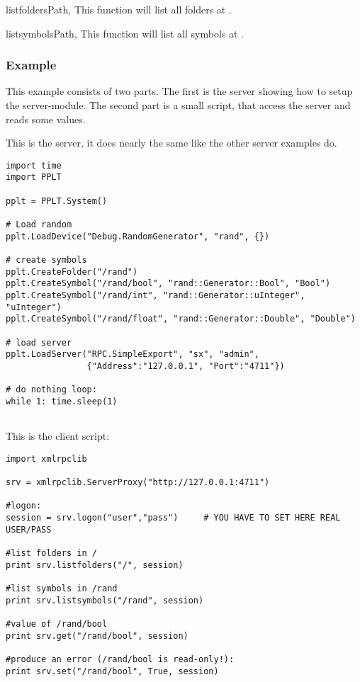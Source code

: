 \begin{funcdescni}{listfolders}{Path, }
This function will list all folders at .
\end{funcdescni}


\begin{funcdescni}{listsymbols}{Path, }
This function will list all symbols at .
\end{funcdescni}


\subsubsection{Example}
This example consists of two parts. The first is the server showing
how to setup the server-module. The second part is a small script, that
access the server and reads some values.

This is the server, it does nearly the same like the other server examples do.
\begin{verbatim}
import time
import PPLT

pplt = PPLT.System()

# Load random
pplt.LoadDevice("Debug.RandomGenerator", "rand", {})

# create symbols
pplt.CreateFolder("/rand")
pplt.CreateSymbol("/rand/bool", "rand::Generator::Bool", "Bool")
pplt.CreateSymbol("/rand/int", "rand::Generator::uInteger", "uInteger")
pplt.CreateSymbol("/rand/float", "rand::Generator::Double", "Double")

# load server
pplt.LoadServer("RPC.SimpleExport", "sx", "admin", 
                {"Address":"127.0.0.1", "Port":"4711"})

# do nothing loop:
while 1: time.sleep(1)
    
\end{verbatim}


This is the client script:
\begin{verbatim}
import xmlrpclib

srv = xmlrpclib.ServerProxy("http://127.0.0.1:4711")

#logon:
session = srv.logon("user","pass")     # YOU HAVE TO SET HERE REAL USER/PASS

#list folders in /
print srv.listfolders("/", session)

#list symbols in /rand
print srv.listsymbols("/rand", session)

#value of /rand/bool
print srv.get("/rand/bool", session)

#produce an error (/rand/bool is read-only!):
print srv.set("/rand/bool", True, session)
\end{verbatim}
